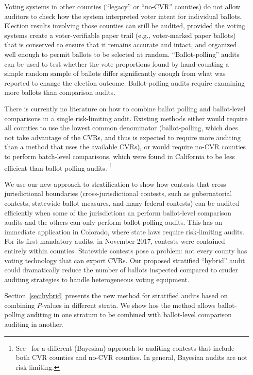 \documentclass[runningheads]{llncs}
\begin{document}
Voting systems in other counties (``legacy'' or ``no-CVR'' counties) 
do not allow auditors to check how the system interpreted voter intent for individual ballots.
Election results involving those counties can still be audited, provided the voting systems
create a voter-verifiable paper trail (e.g., voter-marked paper ballots) that is
conserved to ensure that it remains accurate and intact, and organized well enough
to permit ballots to be selected at random.
``Ballot-polling'' audits \cite{lindemanEtal12,lindemanStark12} can be used to test whether the vote proportions 
found by hand-counting a simple random sample of ballots differ significantly enough from what was reported
to change the election outcome. 
Ballot-polling audits require examining more ballots than comparison audits.

There is currently no literature on how to combine
ballot polling and ballot-level comparisons in a single risk-limiting audit.
Existing methods either would require all counties to use the lowest
common denominator (ballot-polling, which does not take advantage of the CVRs,
and thus is expected to require more auditing than a method that uses the available CVRs),
 or would require no-CVR counties to perform batch-level comparisons, which were found in
California to be less efficient than ballot-polling audits\cite{CA_SOS_EAC}.%
\footnote{%
  See~\cite{Rivest-2018-bayesian-tabulation-audits}
  for a different (Bayesian) approach to auditing contests that include both CVR counties
  and no-CVR counties. In general, Bayesian audits are not risk-limiting.
}

We use our new approach to stratification to show
how contests that cross jurisdictional boundaries (cross-jurisdictional contests, such as gubernatorial contests, statewide ballot measures, and
many federal contests) can be audited efficiently when some of the jurisdictions an perform ballot-level comparison audits
and the others can only perform ballot-polling audits.
This has an immediate application in Colorado, where state laws require
risk-limiting audits.
For its first mandatory audits, in November 2017, contests were contained entirely within counties.
Statewide contests pose a problem:
not every county has voting technology that can export CVRs.
Our proposed stratified ``hybrid'' audit could dramatically reduce the number of ballots inspected
compared to cruder auditing strategies to handle heterogeneous voting equipment.

Section~\ref{sec:hybrid} presents the new method for stratified audits
based on combining $P$-values in different strata.
We show hos the method allows ballot-polling auditing in one 
stratum to be combined with ballot-level comparison auditing in another.
\end{document}
